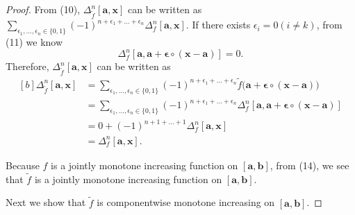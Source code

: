 \documentclass{ijclclp}
\begin{document}
\begin{proof}
    From (10), \(\Delta_{\widetilde{f}}^n[\boldsymbol{a},\boldsymbol{x}]\) can be written as\(\sum\limits_{\epsilon_1,\dots,\epsilon_n\in\{0,1\}}(-1)^{n+\epsilon_1+\dots+\epsilon_n}
            \Delta_f^n[\boldsymbol{a},\boldsymbol{x}]\).
    If there exists \(\epsilon_i=0 (i\neq k)\), from (11) we know
    \[\Delta_f^n[\boldsymbol{a},\boldsymbol{a}+\boldsymbol{\epsilon}\circ(\boldsymbol{x}-\boldsymbol{a})]=0.\]
    Therefore, \(\Delta_{\widetilde{f}}^n[\boldsymbol{a},\boldsymbol{x}]\) can be written as
        \begin{equation}
        \begin{aligned}[b]
            \Delta_{\widetilde{f}}^n[\boldsymbol{a},\boldsymbol{x}]&=
            \sum_{\epsilon_1,\dots,\epsilon_n\in\{0,1\}}(-1)^{n+\epsilon_1+\dots+\epsilon_n}
            \widetilde{f}\big(\boldsymbol{a}+\boldsymbol{\epsilon}\circ(\boldsymbol{x}-\boldsymbol{a})\big)\\
            &=\sum_{\epsilon_1,\dots,\epsilon_n\in\{0,1\}}(-1)^{n+\epsilon_1+\dots+\epsilon_n}
            \Delta_f^n[\boldsymbol{a},\boldsymbol{a}+\boldsymbol{\epsilon}\circ(\boldsymbol{x}-\boldsymbol{a})]\\
            &=0+(-1)^{n+1+\dots+1}\Delta_f^n[\boldsymbol{a},\boldsymbol{x}]\\
            &=\Delta_f^n[\boldsymbol{a},\boldsymbol{x}].
        \end{aligned}
    \end{equation}
    
    Because \(f\) is a jointly monotone increasing function on \([\boldsymbol{a},
    \boldsymbol{b}]\), from (14), we see that \(\widetilde{f}\) is a jointly monotone increasing function on \([\boldsymbol{a},
    \boldsymbol{b}]\).
    
    Next we show that \(\widetilde{f}\) is componentwise monotone increasing on \([\boldsymbol{a},
    \boldsymbol{b}]\). 
    

\end{proof}
\end{document}
